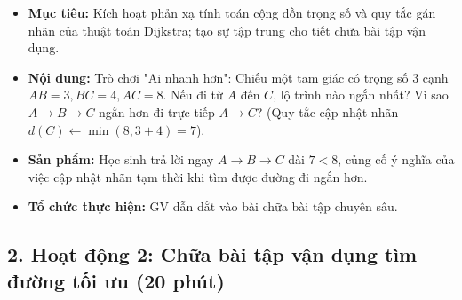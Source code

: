 \documentclass[12pt, a4paper]{article}
\begin{document}
\begin{itemize}[leftmargin=1.2cm]
    \item[a)] \textbf{Mục tiêu:} Kích hoạt phản xạ tính toán cộng dồn trọng số và quy tắc gán nhãn của thuật toán Dijkstra; tạo sự tập trung cho tiết chữa bài tập vận dụng.
    \item[b)] \textbf{Nội dung:} Trò chơi "Ai nhanh hơn": Chiếu một tam giác có trọng số 3 cạnh $AB=3, BC=4, AC=8$. Nếu đi từ $A$ đến $C$, lộ trình nào ngắn nhất? Vì sao $A \to B \to C$ ngắn hơn đi trực tiếp $A \to C$? (Quy tắc cập nhật nhãn $d(C) \leftarrow \min(8, 3+4) = 7$).
    \item[c)] \textbf{Sản phẩm:} Học sinh trả lời ngay $A \to B \to C$ dài $7 < 8$, củng cố ý nghĩa của việc cập nhật nhãn tạm thời khi tìm được đường đi ngắn hơn.
    \item[d)] \textbf{Tổ chức thực hiện:} GV dẫn dắt vào bài chữa bài tập chuyên sâu.
\end{itemize}

\subsection*{2. Hoạt động 2: Chữa bài tập vận dụng tìm đường tối ưu (20 phút)}
\end{document}
